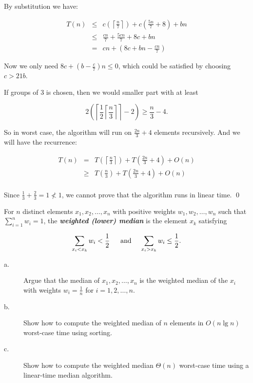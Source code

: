 By substitution we have:

\begin{eqnarray*}
T(n)  &\leq& c\left(\left\lceil\frac{n}{7}\right\rceil\right) + c\left(\frac{5n}{7} + 8\right) + bn\\
&\leq& \frac{cn}{7} + \frac{5cn}{7} + 8c + bn\\
&=&cn + \left(8c + bn - \frac{cn}{7}\right)
\end{eqnarray*}

Now we only need $8c + \left(b - \frac{c}{7}\right)n \leq 0$, which could be satisfied by choosing $c > 21b$.

If groups of $3$ is chosen, then we would smaller part with at least

$$2\left(\left\lceil\frac{1}{2}\left\lceil\frac{n}{3}\right\rceil\right\rceil -2\right) \geq \frac{n}{3} - 4.$$

So in worst case, the algorithm will run on $\frac{2n}{3} + 4$ elements recursively. And we will have the recurrence:

\begin{eqnarray*}
T(n) &=& T\left(\left\lceil\frac{n}{3}\right\rceil\right) + T\left(\frac{2n}{3} + 4\right) + O(n)\\
&\geq& T\left(\frac{n}{3}\right) + T\left(\frac{2n}{3} + 4\right) + O(n)\\
\end{eqnarray*}

Since $\frac{1}{3} + \frac{2}{3} = 1 \nless 1$,  we cannot prove that the algorithm runs in linear time.
\qed

For $n$ distinct elements $x_1, x_2, \ldots, x_n$ with positive weights $w_1, w_2, \ldots, w_n$ such that $\sum_{i = 1}^{n}w_i = 1$, the \textsl{\textbf{weighted (lower) median}} is the 
element $x_k$ satisfying

$$\sum_{x_i < x_k}w_i < \frac{1}{2} \text{ \hspace{9pt} and \hspace{6pt}  } \sum_{x_i>x_k}w_i \leq \frac{1}{2}.$$

\begin{description}
\item[a. \hspace{9pt}] Argue that the median of $x_1, x_2, \ldots, x_n$ is the weighted median of the $x_i$ with weights $w_i = \frac{1}{n}$ for $i = 1, 2, \ldots, n$.

\item[b. \hspace{9pt}] Show how to compute the weighted median of $n$ elements in $O(n \lg n)$ worst-case time using sorting.

\item[c. \hspace{9pt}] Show how to compute the weighted median $\Theta(n)$ worst-case time using a linear-time median algorithm.
\end{description}

